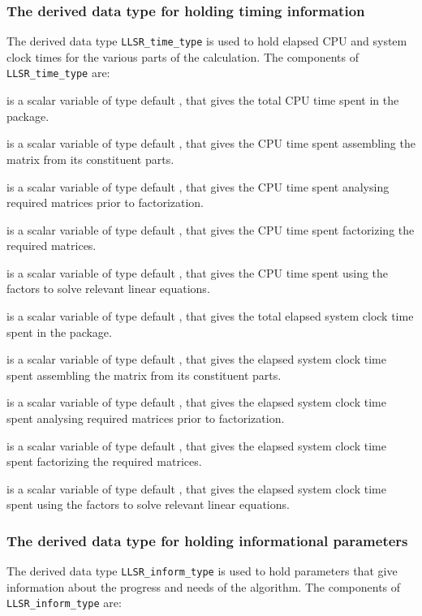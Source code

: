 \documentclass{galahad}
\newcommand{\packagename}{LLSR}
\begin{document}
\subsubsection{The derived data type for holding timing
 information}\label{typetime}
The derived data type
{\tt \packagename\_time\_type}
is used to hold elapsed CPU and system clock times for the various parts of
the calculation. The components of
{\tt \packagename\_time\_type}
are:
\begin{description}
 is a scalar variable of type default \realdp, that gives
 the total CPU time spent in the package.

 is a scalar variable of type default \realdp, that gives
 the CPU time spent assembling the matrix  from its constituent parts.

 is a scalar variable of type default \realdp, that gives
 the CPU time spent analysing required matrices prior to factorization.

 is a scalar variable of type default \realdp, that gives
 the CPU time spent factorizing the required matrices.

 is a scalar variable of type default \realdp, that gives
 the CPU time spent using the factors to solve relevant linear equations.

 is a scalar variable of type default \realdp, that gives
 the total elapsed system clock time spent in the package.

 is a scalar variable of type default \realdp, that gives
 the elapsed system clock time spent assembling the matrix  from
its constituent parts.

 is a scalar variable of type default \realdp, that gives
 the elapsed system clock time spent analysing required matrices prior to
factorization.

 is a scalar variable of type default \realdp, that gives
 the elapsed system clock time spent factorizing the required matrices.

 is a scalar variable of type default \realdp, that gives
 the elapsed system clock time spent using the factors to solve relevant
linear equations.

\end{description}


\subsubsection{The derived data type for holding informational
 parameters}\label{typeinform}
The derived data type
{\tt \packagename\_inform\_type}
is used to hold parameters that give information about the progress and needs
of the algorithm. The components of
{\tt \packagename\_inform\_type}
are:
\end{document}
